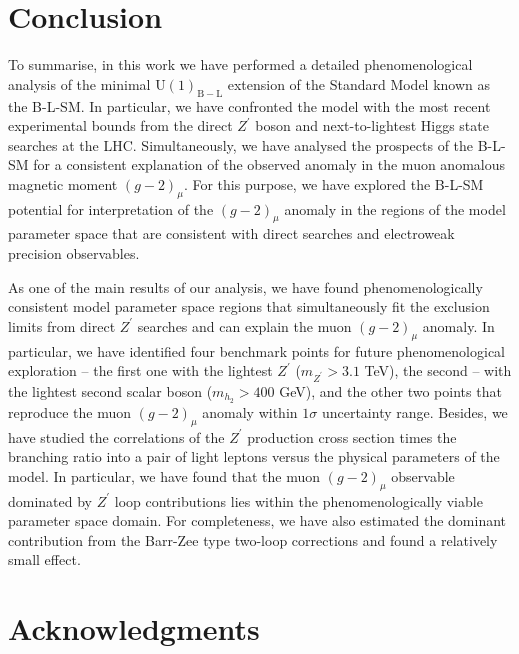 \documentclass[a4paper,11pt]{article}
\renewcommand{\(}{\left(}
\renewcommand{\)}{\right)}
\renewcommand{\[}{\left[}
\renewcommand{\]}{\right]}
\newcommand{\U}[1]{\mathrm{U}(1)_{\mathrm{#1}}}			%
\begin{document}
\section{Conclusion}
\label{sec:Conclusions}

To summarise, in this work we have performed a detailed phenomenological analysis of the
minimal $\U{B-L}$ extension of the Standard Model known as the B-L-SM. In particular, 
we have confronted the model with the most recent experimental bounds from the direct 
$Z^\prime$ boson and next-to-lightest Higgs state searches at the LHC. Simultaneously, 
we have analysed the prospects of the B-L-SM for a consistent explanation 
of the observed anomaly in the muon anomalous magnetic moment $(g-2)_{\mu}$. 
For this purpose, we have explored the B-L-SM potential for interpretation of the $(g-2)_{\mu}$ anomaly in the regions of the model parameter space that 
are consistent with direct searches and electroweak precision observables.

As one of the main results of our analysis, we have found phenomenologically consistent model parameter space regions that simultaneously fit the exclusion limits from direct $Z^\prime$ searches and can explain the muon $(g-2)_{\mu}$ anomaly. In particular, we have identified four benchmark points for future phenomenological exploration -- the first one with the lightest $Z^\prime$ ($m_{Z^\prime}>3.1$ TeV), the second -- with the lightest second scalar boson ($m_{h_2}>400$ GeV), and the other two points that reproduce the muon $(g-2)_{\mu}$ anomaly within $1\sigma$ uncertainty range. Besides, we have studied the correlations of the $Z^\prime$ production cross section times the branching ratio into a pair of light leptons versus the physical parameters of the model. In particular, we have found that the muon $(g-2)_{\mu}$ observable dominated by $Z^\prime$ loop contributions lies within the phenomenologically viable parameter space domain. For completeness, we have also estimated the dominant contribution from the Barr-Zee type two-loop corrections and found a relatively small effect.

\section*{Acknowledgments}
\end{document}
